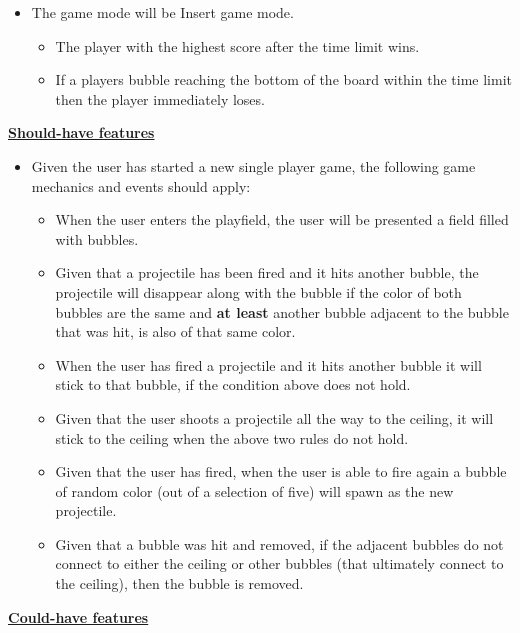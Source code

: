 \documentclass[a4paper,11pt]{article}
\begin{document}
\begin{itemize}
  \item The game mode will be \lbrack Insert game mode\rbrack.
  \begin{itemize}
    \item The player with the highest score after the time limit wins.
    \item If a players bubble reaching the bottom of the board within the time limit then the player immediately loses. \\
  \end{itemize}
  \end{itemize}

\newpage
\noindent
\textbf{\underline{Should-have features}}
\begin{itemize}
\item Given the user has started a new single player game, the following game mechanics and events should apply:
  \begin{itemize}
    \item When the user enters the playfield, the user will be presented a field filled with bubbles.
    \item Given that a projectile has been fired and it hits another bubble, the projectile will disappear along with the bubble if the color of both bubbles are the same and \textbf{at least} another bubble adjacent to the bubble that was hit, is also of that same color.
    \item When the user has fired a projectile and it hits another bubble it will stick to that bubble, if the condition above does not hold.
    \item Given that the user shoots a projectile all the way to the ceiling, it will stick to the ceiling when the above two rules do not hold.
    \item Given that the user has fired, when the user is able to fire again a bubble of random color (out of a selection of five) will spawn as the new projectile.
    \item Given that a bubble was hit and removed, if the adjacent bubbles do not connect to either the ceiling or other bubbles (that ultimately connect to the ceiling), then the bubble is removed. \\
  \end{itemize}
\end{itemize}
\noindent
\textbf{\underline{Could-have features}}
\end{document}
